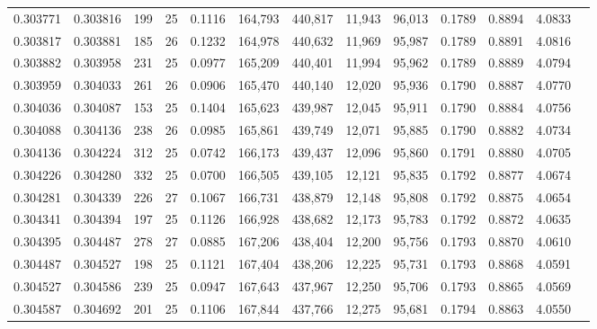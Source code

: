 \begin{tabular}{rrrrrrrrrrrrr}
0.303771 & 0.303816 &   199 &  25 &                                     0.1116 & 164,793 & 440,817 &  11,943 &  96,013 & 0.1789 & 0.8894 & 4.0833 \\
0.303817 & 0.303881 &   185 &  26 &                                     0.1232 & 164,978 & 440,632 &  11,969 &  95,987 & 0.1789 & 0.8891 & 4.0816 \\
0.303882 & 0.303958 &   231 &  25 &                                     0.0977 & 165,209 & 440,401 &  11,994 &  95,962 & 0.1789 & 0.8889 & 4.0794 \\
0.303959 & 0.304033 &   261 &  26 &                                     0.0906 & 165,470 & 440,140 &  12,020 &  95,936 & 0.1790 & 0.8887 & 4.0770 \\
0.304036 & 0.304087 &   153 &  25 &                                     0.1404 & 165,623 & 439,987 &  12,045 &  95,911 & 0.1790 & 0.8884 & 4.0756 \\
0.304088 & 0.304136 &   238 &  26 &                                     0.0985 & 165,861 & 439,749 &  12,071 &  95,885 & 0.1790 & 0.8882 & 4.0734 \\
0.304136 & 0.304224 &   312 &  25 &                                     0.0742 & 166,173 & 439,437 &  12,096 &  95,860 & 0.1791 & 0.8880 & 4.0705 \\
0.304226 & 0.304280 &   332 &  25 &                                     0.0700 & 166,505 & 439,105 &  12,121 &  95,835 & 0.1792 & 0.8877 & 4.0674 \\
0.304281 & 0.304339 &   226 &  27 &                                     0.1067 & 166,731 & 438,879 &  12,148 &  95,808 & 0.1792 & 0.8875 & 4.0654 \\
0.304341 & 0.304394 &   197 &  25 &                                     0.1126 & 166,928 & 438,682 &  12,173 &  95,783 & 0.1792 & 0.8872 & 4.0635 \\
0.304395 & 0.304487 &   278 &  27 &                                     0.0885 & 167,206 & 438,404 &  12,200 &  95,756 & 0.1793 & 0.8870 & 4.0610 \\
0.304487 & 0.304527 &   198 &  25 &                                     0.1121 & 167,404 & 438,206 &  12,225 &  95,731 & 0.1793 & 0.8868 & 4.0591 \\
0.304527 & 0.304586 &   239 &  25 &                                     0.0947 & 167,643 & 437,967 &  12,250 &  95,706 & 0.1793 & 0.8865 & 4.0569 \\
0.304587 & 0.304692 &   201 &  25 &                                     0.1106 & 167,844 & 437,766 &  12,275 &  95,681 & 0.1794 & 0.8863 & 4.0550 \\

\end{tabular}

